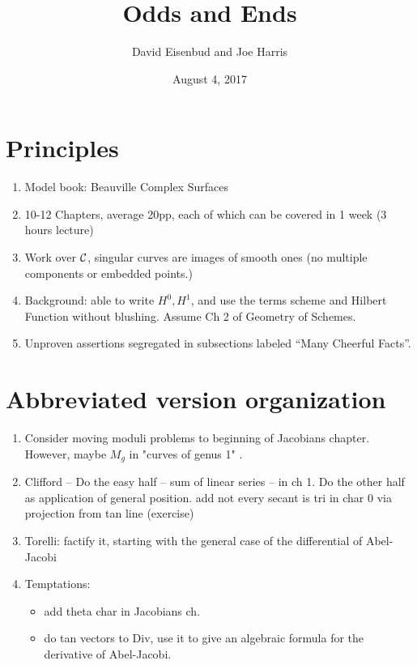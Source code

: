 \documentclass[12pt, leqno]{book}
\date{August 4, 2017}
\title{Odds and Ends}
\author{David Eisenbud and Joe Harris }
\begin{document}
\maketitle

\setlength{\parskip}{5pt}

\section{Principles}
\begin{enumerate}

\item Model book: Beauville Complex Surfaces

\item 10-12 Chapters, average 20pp, each of which can be covered in 1 week (3 hours lecture)

\item Work over $\cC$, singular curves are images of smooth ones (no multiple components or embedded points.)

\item Background: able to write $H^0, H^1$, and use the terms scheme and Hilbert Function  without blushing. Assume Ch 2 of Geometry of Schemes.

\item Unproven assertions segregated in subsections labeled ``Many Cheerful Facts''.
\end{enumerate}

\section{Abbreviated version organization}
\begin{enumerate}
\item Consider moving moduli problems to beginning of Jacobians chapter. However, maybe $M_g$ in "curves of genus 1" .

\item Clifford -- Do the easy half -- sum of linear series -- in ch 1. Do the other half as application of general position. add not every secant is tri in char 0 via projection from tan line (exercise)

\item Torelli: factify it, starting with the general case of the differential of Abel-Jacobi

\item Temptations: 
	
\begin{itemize}
 \item add theta char in Jacobians ch. 
\item do tan vectors to Div, use it to give an algebraic formula for the derivative of Abel-Jacobi.
\end{itemize}
 

\end{enumerate}
\end{document}
